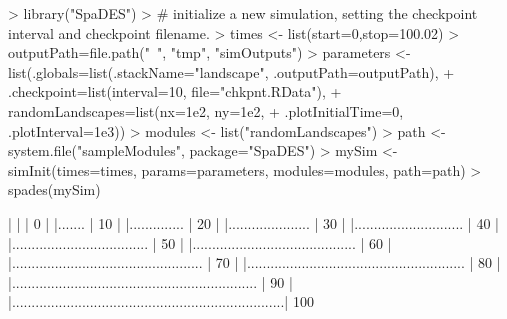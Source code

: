 \documentclass{article}
\begin{document}
\begin{Schunk}
\begin{Sinput}
> library("SpaDES")
> # initialize a new simulation, setting the checkpoint interval and checkpoint filename.
> times <- list(start=0,stop=100.02)
> outputPath=file.path("~", "tmp", "simOutputs")
> parameters <- list(.globals=list(.stackName="landscape", .outputPath=outputPath),
+                    .checkpoint=list(interval=10, file="chkpnt.RData"),
+                    randomLandscapes=list(nx=1e2, ny=1e2,
+                      .plotInitialTime=0, .plotInterval=1e3))
> modules <- list("randomLandscapes")
> path <- system.file("sampleModules", package="SpaDES")
> mySim <- simInit(times=times, params=parameters, modules=modules, path=path)
> spades(mySim)
\end{Sinput}
\begin{Soutput}
  |                                                                            
  |                                                                      |   0%
  |                                                                            
  |.......                                                               |  10%
  |                                                                            
  |..............                                                        |  20%
  |                                                                            
  |.....................                                                 |  30%
  |                                                                            
  |............................                                          |  40%
  |                                                                            
  |...................................                                   |  50%
  |                                                                            
  |..........................................                            |  60%
  |                                                                            
  |.................................................                     |  70%
  |                                                                            
  |........................................................              |  80%
  |                                                                            
  |...............................................................       |  90%
  |                                                                            
  |......................................................................| 100%
\end{Soutput}
\end{Schunk}
\end{document}
